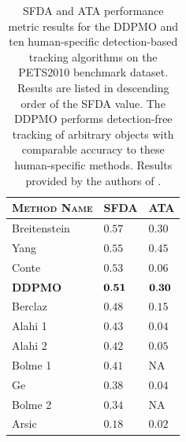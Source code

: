\documentclass{article}
\begin{document}
\begin{table}
    \begin{tabular}[h!] {| l | l | l |}
        \hline
        \textsc{Method Name} & \textsc{SFDA}  & \textsc{ATA} \\ \hline \hline
        Breitenstein \cite{breitenstein2009markovian} & $ 0.57 $ & $0.30$ \\ \hline
        Yang \cite{yang2009probabilistic} & $ 0.55 $ & $0.45$ \\ \hline
        Conte \cite{conte2010performance} & $ 0.53  $ & $0.06$ \\ \hline
        \textbf{DDPMO} & $ \bold{0.51} $ & $\bold{0.30}$ \\ \hline
        Berclaz \cite{berclaz2009multiple} & $ 0.48 $ & $0.15$ \\ \hline
        Alahi 1 \cite{alahi2009sparsity} & $ 0.43 $ & $0.04$ \\ \hline
        Alahi 2 \cite{alahi2009sparsity} & $ 0.42 $ & $0.05$ \\ \hline
        Bolme 1 \cite{bolme2009simple} & $ 0.41 $ & NA \\ \hline
        Ge \cite{ge2009evaluation} & $ 0.38 $ & $0.04$ \\ \hline
        Bolme 2 \cite{bolme2009simple} & $ 0.34 $ & NA \\ \hline
        Arsic \cite{arsic2009multi} & $ 0.18 $ & $0.02$ \\
        \hline
    \end{tabular}
        \caption{SFDA and ATA performance metric results for the DDPMO and ten human-specific detection-based tracking algorithms on the PETS2010 benchmark dataset. Results are listed in descending order of the SFDA value. The DDPMO performs detection-free tracking of arbitrary objects with comparable accuracy to these human-specific methods. Results provided by the authors of \cite{ellis_2010}.}
        \label{benchmark_results_table}
\end{table}
\end{document}
